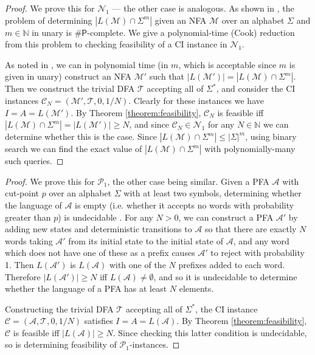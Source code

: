 \documentclass[a4paper,USenglish,numberwithinsect]{lipics}
\theoremstyle{plain}
\theoremstyle{definition}
\newcommand{\N}{\mathbb{N}}
\newcommand{\sharpP}{\ensuremath{\mathsf{\# P}}}
\newcommand{\improvs}{I}
\newcommand{\valids}{A}
\begin{document}
\theoremNFAHardness*
\begin{proof}
We prove this for $\mathcal{N}_1$ --- the other case is analogous. As shown in \cite{sharpNFA}, the problem of determining $| L(\mathcal{M}) \cap \Sigma^m |$ given an NFA $\mathcal{M}$ over an alphabet $\Sigma$ and $m \in \N$ in unary is $\sharpP$-complete. We give a polynomial-time (Cook) reduction from this problem to checking feasibility of a CI instance in $\mathcal{N}_1$.

As noted in \cite{sharpNFA}, we can in polynomial time (in $m$, which is acceptable since $m$ is given in unary) construct an NFA $\mathcal{M'}$ such that $|L(\mathcal{M'})| = |L(\mathcal{M}) \cap \Sigma^m|$. Then we construct the trivial DFA $\mathcal{T}$ accepting all of $\Sigma^*$, and consider the CI instances $\mathcal{C}_N = (\mathcal{M'}, \mathcal{T}, 0, 1/N)$. Clearly for these instances we have $\improvs = \valids = L(\mathcal{M'})$. By Theorem \ref{theorem:feasibility}, $\mathcal{C}_N$ is feasible iff $|L(\mathcal{M}) \cap \Sigma^m| = |L(\mathcal{M'})| \ge N$, and since $\mathcal{C}_N \in \mathcal{N}_1$ for any $N \in \N$ we can determine whether this is the case. Since $|L(\mathcal{M}) \cap \Sigma^m| \le |\Sigma|^m$, using binary search we can find the exact value of $|L(\mathcal{M}) \cap \Sigma^m|$ with polynomially-many such queries.
\end{proof}

\theoremPFAHardness*
\begin{proof}
We prove this for $\mathcal{P}_1$, the other case being similar. Given a PFA $\mathcal{A}$ with cut-point $p$ over an alphabet $\Sigma$ with at least two symbols, determining whether the language of $\mathcal{A}$ is empty (i.e. whether it accepts no words with probability greater than $p$) is undecidable \cite{nasu-honda,condon-lipton}. For any $N > 0$, we can construct a PFA $\mathcal{A'}$ by adding new states and deterministic transitions to $\mathcal{A}$ so that there are exactly $N$ words taking $\mathcal{A'}$ from its initial state to the initial state of $\mathcal{A}$, and any word which does not have one of these as a prefix causes $\mathcal{A'}$ to reject with probability 1. Then $L(\mathcal{A'})$ is $L(\mathcal{A})$ with one of the $N$ prefixes added to each word. Therefore $|L(\mathcal{A'})| \ge N$ iff $L(\mathcal{A}) \ne \emptyset$, and so it is undecidable to determine whether the language of a PFA has at least $N$ elements.

Constructing the trivial DFA $\mathcal{T}$ accepting all of $\Sigma^*$, the CI instance $\mathcal{C} = (\mathcal{A}, \mathcal{T}, 0, 1/N)$ satisfies $\improvs = \valids = L(\mathcal{A})$. By Theorem \ref{theorem:feasibility}, $\mathcal{C}$ is feasible iff $|L(\mathcal{A})| \ge N$. Since checking this latter condition is undecidable, so is determining feasibility of $\mathcal{P}_1$-instances.
\end{proof}
\end{document}
